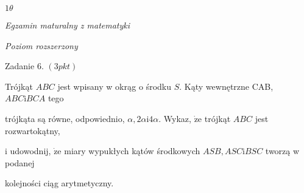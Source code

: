 \documentclass[a4paper,12pt]{article}
\begin{document}
$ 1\theta$

{\it Egzamin maturalny z matematyki}

{\it Poziom rozszerzony}

Zadanie 6. $(3pkt)$

Trójkąt $ABC$ jest wpisany w okrąg o środku $S$. Kąty wewnętrzne CAB, $ABC\mathrm{i}BCA$ tego

trójkąta są równe, odpowiednio, $\alpha,  2\alpha \mathrm{i}  4\alpha$. Wykaz, $\dot{\mathrm{z}}\mathrm{e}$ trójkąt $ABC$ jest rozwartokątny,

i udowodnij, $\dot{\mathrm{z}}\mathrm{e}$ miary wypukłych kątów środkowych $ASB, ASC\mathrm{i}BSC$ tworzą w podanej

kolejności ciąg arytmetyczny.
\end{document}
